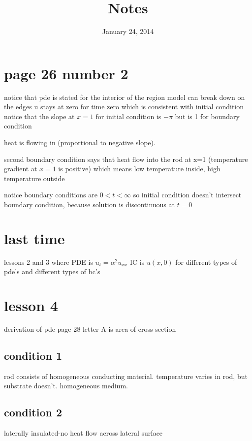 \documentclass{article}
\begin{document}
\title{Notes}
\date{January 24, 2014}
\maketitle
\section*{page 26 number 2}

notice that pde is stated for the interior of the region
model can break down on the edges
u stays at zero for time zero which is consistent with initial condition
notice that the slope at $x=1$ for initial condition is $-\pi$ but is 1 for boundary condition

heat is flowing in (proportional to negative slope).

second boundary condition says that heat flow into the rod at x=1 (temperature gradient at $x=1$ is positive) which means low temperature inside, high temperature outside

notice boundary conditions are $0<t<\infty$ so initial condition doesn't intersect boundary condition, because solution is discontinuous at $t=0$

\section*{last time}
lessons 2 and 3 where PDE is $u_t=\alpha^2 u_{xx}$ IC is $u(x,0)$ for different types of pde's and different types of bc's

\section*{lesson 4}
derivation of pde
page 28
letter A is area of cross section
\subsection*{condition 1}
rod consists of homogeneous conducting material.  temperature varies in rod, but substrate doesn't. homogeneous medium.
\subsection*{condition 2}
laterally insulated-no heat flow across lateral surface
\end{document}
